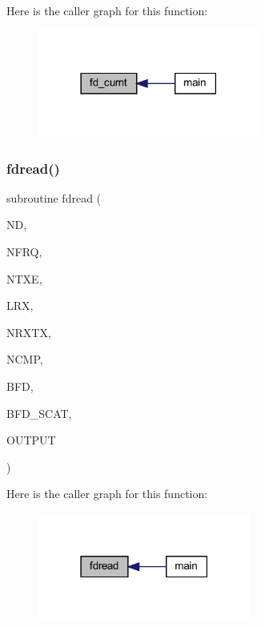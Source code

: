 Here is the caller graph for this function\+:
\nopagebreak
\begin{figure}[H]
\begin{center}
\leavevmode
\includegraphics[width=206pt]{Marco_8f90_a26a547e1b65b547041c0eac9e900a10d_icgraph}
\end{center}
\end{figure}
\mbox{\label{Marco_8f90_abbb41678ead372cf2ac619487c6fe732}} 
\subsubsection{\texorpdfstring{fdread()}{fdread()}}
{\footnotesize\ttfamily subroutine fdread (\begin{DoxyParamCaption}\item[{integer}]{ND,  }\item[{integer}]{N\+F\+RQ,  }\item[{integer}]{N\+T\+XE,  }\item[{integer}]{L\+RX,  }\item[{integer, dimension(ntxe)}]{N\+R\+X\+TX,  }\item[{integer, dimension(lrx,ntxe)}]{N\+C\+MP,  }\item[{complex, dimension(nfrq,lrx,ntxe,3)}]{B\+FD,  }\item[{complex, dimension(nfrq,lrx,ntxe,3)}]{B\+F\+D\+\_\+\+S\+C\+AT,  }\item[{integer}]{O\+U\+T\+P\+UT }\end{DoxyParamCaption})}

Here is the caller graph for this function\+:
\nopagebreak
\begin{figure}[H]
\begin{center}
\leavevmode
\includegraphics[width=198pt]{Marco_8f90_abbb41678ead372cf2ac619487c6fe732_icgraph}
\end{center}
\end{figure}
\mbox{\label{Marco_8f90_afd1cc93ca825c04293fe19df43045f99}} 
